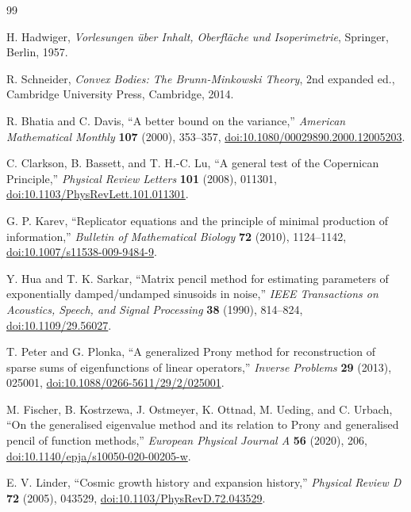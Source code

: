 \documentclass[aps,prd,reprint,onecolumn,nofootinbib,superscriptaddress,showkeys]{revtex4-2}
\numberwithin{equation}{section}
\theoremstyle{definition}
\theoremstyle{plain}
\begin{document}
\begin{thebibliography}{99}

H. Hadwiger, \emph{Vorlesungen \"uber Inhalt, Oberfl\"ache und Isoperimetrie}, Springer, Berlin, 1957.

R. Schneider, \emph{Convex Bodies: The Brunn-Minkowski Theory}, 2nd expanded ed., Cambridge University Press, Cambridge, 2014.

R. Bhatia and C. Davis, ``A better bound on the variance,''
\emph{American Mathematical Monthly} \textbf{107} (2000), 353--357,
\href{https://doi.org/10.1080/00029890.2000.12005203}{doi:10.1080/00029890.2000.12005203}.

C. Clarkson, B. Bassett, and T. H.-C. Lu, ``A general test of the Copernican Principle,''
\emph{Physical Review Letters} \textbf{101} (2008), 011301,
\href{https://doi.org/10.1103/PhysRevLett.101.011301}{doi:10.1103/PhysRevLett.101.011301}.

G. P. Karev, ``Replicator equations and the principle of minimal production of information,''
\emph{Bulletin of Mathematical Biology} \textbf{72} (2010), 1124--1142,
\href{https://doi.org/10.1007/s11538-009-9484-9}{doi:10.1007/s11538-009-9484-9}.

Y. Hua and T. K. Sarkar, ``Matrix pencil method for estimating parameters of exponentially damped/undamped sinusoids in noise,''
\emph{IEEE Transactions on Acoustics, Speech, and Signal Processing} \textbf{38} (1990), 814--824,
\href{https://doi.org/10.1109/29.56027}{doi:10.1109/29.56027}.

T. Peter and G. Plonka, ``A generalized Prony method for reconstruction of sparse sums of eigenfunctions of linear operators,''
\emph{Inverse Problems} \textbf{29} (2013), 025001,
\href{https://doi.org/10.1088/0266-5611/29/2/025001}{doi:10.1088/0266-5611/29/2/025001}.

M. Fischer, B. Kostrzewa, J. Ostmeyer, K. Ottnad, M. Ueding, and C. Urbach,
``On the generalised eigenvalue method and its relation to Prony and generalised pencil of function methods,''
\emph{European Physical Journal A} \textbf{56} (2020), 206,
\href{https://doi.org/10.1140/epja/s10050-020-00205-w}{doi:10.1140/epja/s10050-020-00205-w}.

E. V. Linder, ``Cosmic growth history and expansion history,''
\emph{Physical Review D} \textbf{72} (2005), 043529,
\href{https://doi.org/10.1103/PhysRevD.72.043529}{doi:10.1103/PhysRevD.72.043529}.




\end{thebibliography}
\end{document}
